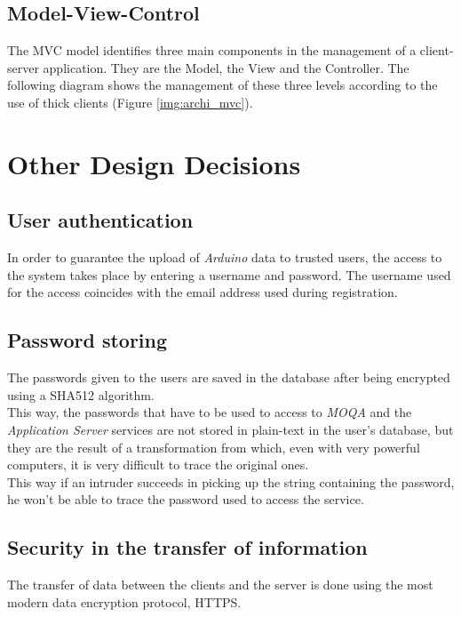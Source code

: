 \subsection{Model-View-Control}
The MVC model identifies three main components in the management of a client-server application. They are the Model, the View and the Controller.
The following diagram shows the management of these three levels according to the use of thick clients (Figure \ref{img:archi_mvc}).
\linebreak[6]

\section{Other Design Decisions}
\subsection{User authentication}
In order to guarantee the upload of \textit{Arduino} data to trusted users, the access to the system takes place by entering a username and password.
The username used for the access coincides with the email address used during registration.

\subsection{Password storing}
The passwords given to the users are saved in the database after being encrypted using a SHA512 algorithm.\\
This way, the passwords that have to be used to access to \textit{MOQA} and the \textit{Application Server} services are not stored in plain-text in the user's database, but they are the result of a transformation from which, even with very powerful computers, it is very difficult to trace the original ones.\\
This way if an intruder succeeds in picking up the string containing the password, he won't be able to trace the password used to access the service.

\subsection{Security in the transfer of information}
The transfer of data between the clients and the server is done using the most modern data encryption protocol, HTTPS.

